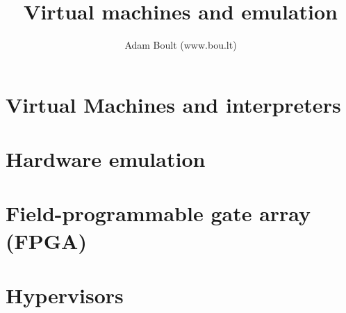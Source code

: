 \documentclass[oneside]{book}
\begin{document}
\author{Adam Boult (www.bou.lt)}
\title{Virtual machines and emulation}
\maketitle

\setcounter{tocdepth}{0}
\tableofcontents



\part{Virtual Machines and interpreters}


\part{Hardware emulation}

\part{Field-programmable gate array (FPGA)}

\part{Hypervisors}
\end{document}
